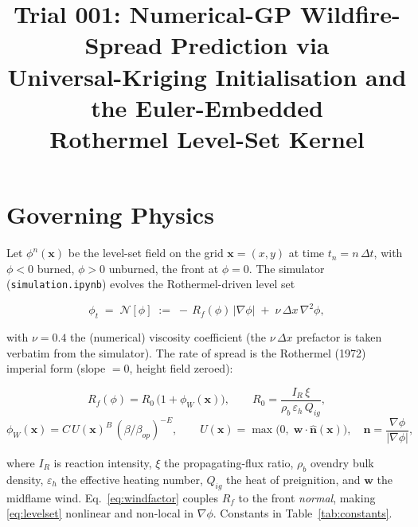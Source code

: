 \documentclass[11pt]{article}
\title{Trial 001: Numerical-GP Wildfire-Spread Prediction via\\
Universal-Kriging Initialisation and the Euler-Embedded\\
Rothermel Level-Set Kernel}
\author{}
\date{}
\newcommand{\bx}{\mathbf{x}}
\newcommand{\bw}{\mathbf{w}}
\newcommand{\nhat}{\hat{\mathbf n}}
\newcommand{\N}{\mathcal{N}}
\begin{document}
\maketitle
\sloppy  %

\section{Governing Physics}

Let $\phi^{n}(\bx)$ be the level-set field on the grid $\bx=(x,y)$ at time
$t_n=n\,\Delta t$, with $\phi<0$ burned, $\phi>0$ unburned, the front at $\phi=0$.
The simulator (\texttt{simulation.ipynb}) evolves the Rothermel-driven level set

\begin{equation}
  \label{eq:levelset}
  \phi_t \;=\; \N[\phi]
  \;:=\; -\,R_f(\phi)\,\lvert\nabla\phi\rvert
  \;+\; \nu\,\Delta x\,\nabla^{2}\phi ,
\end{equation}

with $\nu=0.4$ the (numerical) viscosity coefficient (the $\nu\,\Delta x$ prefactor
is taken verbatim from the simulator). The rate of spread is the Rothermel (1972)
imperial form (slope $=0$, height field zeroed):

\begin{equation}
  \label{eq:Rf}
  R_f(\phi) = R_0\,\bigl(1+\phi_W(\bx)\bigr),
  \qquad
  R_0=\frac{I_R\,\xi}{\rho_b\,\varepsilon_h\,Q_{ig}},
\end{equation}
\begin{equation}
  \label{eq:windfactor}
  \phi_W(\bx)=C\,U(\bx)^{B}\,(\beta/\beta_{op})^{-E},
  \qquad
  U(\bx)=\max\!\bigl(0,\;\bw\cdot\nhat(\bx)\bigr),
  \quad
  \nhat=\frac{\nabla\phi}{\lvert\nabla\phi\rvert},
\end{equation}

where $I_R$ is reaction intensity, $\xi$ the propagating-flux ratio, $\rho_b$
ovendry bulk density, $\varepsilon_h$ the effective heating number, $Q_{ig}$ the
heat of preignition, and $\bw$ the midflame wind. Eq.~\eqref{eq:windfactor}
couples $R_f$ to the front \emph{normal}, making \eqref{eq:levelset} nonlinear and
non-local in $\nabla\phi$. Constants in Table~\ref{tab:constants}.
\end{document}
